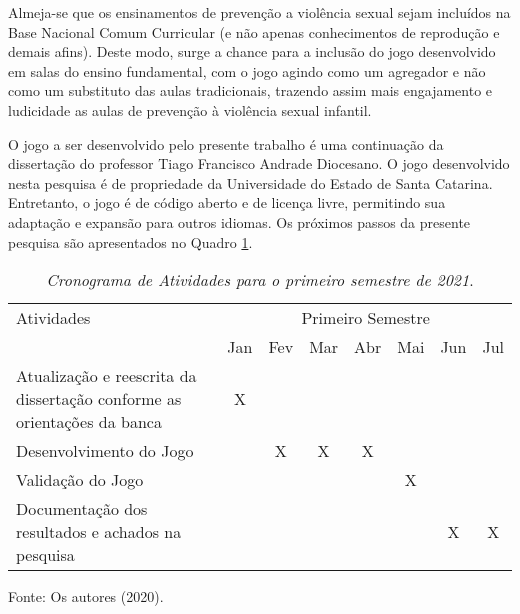 Almeja-se que os ensinamentos de prevenção a violência sexual sejam incluídos na Base Nacional Comum Curricular (e não apenas conhecimentos de reprodução e demais afins). Deste modo, surge a chance para a inclusão do jogo desenvolvido em salas do ensino fundamental, com o jogo agindo como um agregador e não como um substituto das aulas tradicionais, trazendo assim mais engajamento e ludicidade as aulas de prevenção à violência sexual infantil.

    

O jogo a ser desenvolvido pelo presente trabalho é uma continuação da dissertação do professor Tiago Francisco Andrade Diocesano. %
O jogo desenvolvido nesta pesquisa é de propriedade da Universidade do Estado de Santa Catarina. Entretanto, o jogo é de código aberto e de licença livre, permitindo sua adaptação e expansão para outros idiomas. Os próximos passos da presente pesquisa são apresentados no Quadro \ref{tabelinha}.

\captionsetup[table]{name=Quadro}
\begin{table}[!htb]
    \centering
    \renewcommand{\arraystretch}{1.5} %
    \caption{\emph{Cronograma de Atividades para o primeiro semestre de 2021}.}\label{tabelinha}
    \vspace{0.2cm}
    \begin{tabular}{|p{8cm}|c|c|c|c|c|c|c|}
    \hline
    Atividades & \multicolumn{7}{|c|}{Primeiro Semestre} \\
    \cline{2-8}                                                                             & Jan   & Fev   & Mar   & Abr   & Mai   & Jun   & Jul   \\
    \hline Atualização e reescrita da dissertação conforme as orientações da banca          & X     &       &       &       &       &       &       \\
    \hline Desenvolvimento do Jogo                                                          &       & X     & X     & X     &       &       &       \\
    \hline Validação do Jogo                                                                &       &       &       &       & X     &       &       \\
    \hline Documentação dos resultados e achados na pesquisa                                &       &       &       &       &       & X     & X     \\
    \hline
    \end{tabular} 
    Fonte: Os autores (2020).
\end{table}


